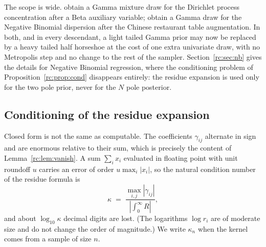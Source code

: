 The scope is wide. \citet{rc:escobar1995} obtain a Gamma mixture draw for the Dirichlet process concentration after a Beta auxiliary variable; \citet{rc:zhou2015} obtain a Gamma draw for the Negative Binomial dispersion after the Chinese restaurant table augmentation. In both, and in every descendant, a light tailed Gamma prior may now be replaced by a heavy tailed half horseshoe at the cost of one extra univariate draw, with no Metropolis step and no change to the rest of the sampler. Section~\ref{rc:sec:nb} gives the details for Negative Binomial regression, where the conditioning problem of Proposition~\ref{rc:prop:cond} disappears entirely: the residue expansion is used only for the two pole prior, never for the $N$ pole posterior.

\subsection{Conditioning of the residue expansion}

Closed form is not the same as computable. The coefficients $\gamma_{ij}$ alternate in sign and are enormous relative to their sum, which is precisely the content of Lemma~\ref{rc:lem:vanish}. A sum $\sum_i x_i$ evaluated in floating point with unit roundoff $u$ carries an error of order $u\max_i|x_i|$, so the natural condition number of the residue formula is
\[
\kappa\;=\;\frac{\max_{i,j}|\gamma_{ij}|}{|\int_0^\infty R|},
\]
and about $\log_{10}\kappa$ decimal digits are lost. (The logarithms $\log r_i$ are of moderate size and do not change the order of magnitude.) We write $\kappa_n$ when the kernel comes from a sample of size $n$.

